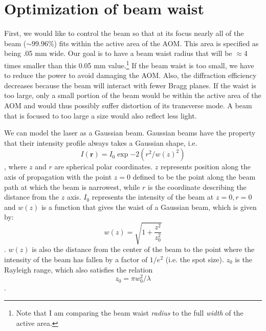 \section{Optimization of beam waist}
First, we would like to control the beam so that at its focus nearly all of the beam ($\sim99.96$\%) fits within the active area of the AOM.
This area is specified as being .05 mm wide. Our goal is to have a beam waist radius that will be $\approx$4 times smaller than this 0.05 mm value.\footnote{Note that I am comparing the beam waist \emph{radius} to the full \emph{width} of the active area.} %
If the beam waist is too small, we have to reduce the power to avoid damaging the AOM. Also, the diffraction efficiency decreases because the beam will interact with fewer Bragg planes. If the waist is too large, only a small portion of the beam would be within the active area of the AOM and would thus possibly suffer distortion of its transverse mode. A beam that is focused to too large a size would also reflect less light.

We can model the laser as a Gaussian beam. Gaussian beams have the property that their intensity profile always takes a Gaussian shape, i.e. \cite{lasersMilonniEberly}
\begin{equation}
    I(\mathbf{r})=I_0\exp{-2(r^2/w(z)^2)}
\end{equation},
where $z$ and $r$ are spherical polar coordinates. $z$ represents position along the axis of propagation with the point $z=0$ defined to be the point along the beam path at which the beam is narrowest, while $r$ is the coordinate describing the distance from the $z$ axis. $I_0$ represents the intensity of the beam at $z=0, r=0$ and $w(z)$ is a function that gives the waist of a Gaussian beam, which is given by:
\begin{equation}
w(z)=\sqrt{1+\frac{z^2}{z_0^2}}\label{beamwaist1D}
\end{equation}.
$w(z)$ is also the distance from the center of the beam to the point where the intensity of the beam has fallen by a factor of $1/e^2$ (i.e. the spot size). $z_0$ is the Rayleigh range, which also satisfies the relation 
\begin{equation}
z_0=\pi w_0^2/\lambda \label{rayleighRange1D}
\end{equation}.

